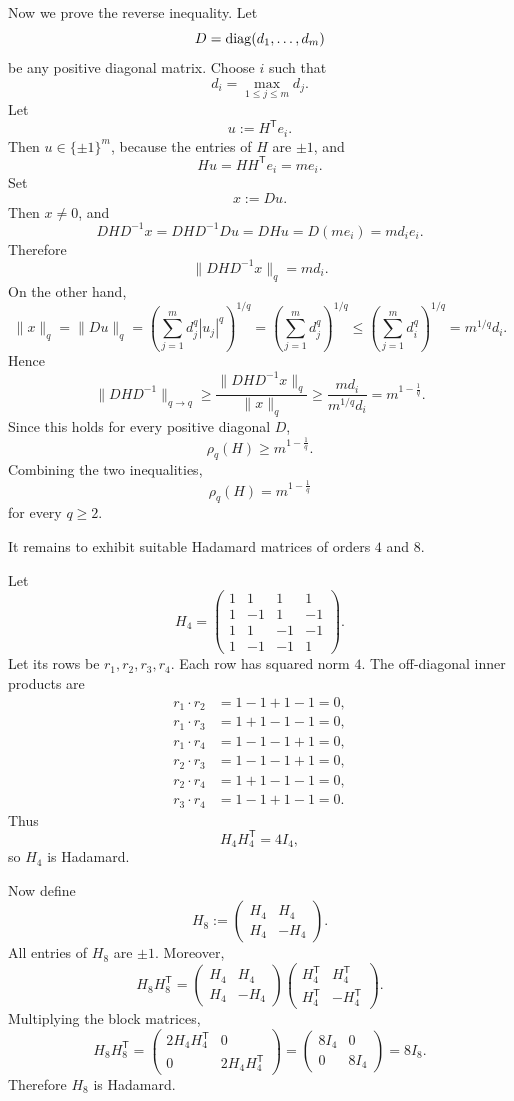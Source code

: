 Now we prove the reverse inequality. Let
\[
D=\operatorname{diag}(d_1,\dots,d_m)
\]
be any positive diagonal matrix. Choose \(i\) such that
\[
d_i=\max_{1\leq j\leq m} d_j.
\]
Let
\[
u:=H^{\mathsf T}e_i.
\]
Then \(u\in \{\pm 1\}^m\), because the entries of \(H\) are \(\pm 1\), and
\[
Hu=HH^{\mathsf T}e_i=m e_i.
\]
Set
\[
x:=Du.
\]
Then \(x\neq 0\), and
\[
DHD^{-1}x
=
DHD^{-1}Du
=
DHu
=
D(me_i)
=
m d_i e_i.
\]
Therefore
\[
\|DHD^{-1}x\|_q=m d_i.
\]
On the other hand,
\[
\|x\|_q
=
\|Du\|_q
=
\left(\sum_{j=1}^m d_j^q |u_j|^q\right)^{1/q}
=
\left(\sum_{j=1}^m d_j^q\right)^{1/q}
\leq
\left(\sum_{j=1}^m d_i^q\right)^{1/q}
=
m^{1/q}d_i.
\]
Hence
\[
\|DHD^{-1}\|_{q\to q}
\geq
\frac{\|DHD^{-1}x\|_q}{\|x\|_q}
\geq
\frac{m d_i}{m^{1/q}d_i}
=
m^{1-\frac1q}.
\]
Since this holds for every positive diagonal \(D\),
\[
\rho_q(H)\geq m^{1-\frac1q}.
\]
Combining the two inequalities,
\[
\boxed{\rho_q(H)=m^{1-\frac1q}}
\]
for every \(q\geq 2\).

It remains to exhibit suitable Hadamard matrices of orders \(4\) and \(8\).

Let
\[
H_4=
\begin{pmatrix}
1&1&1&1\\
1&-1&1&-1\\
1&1&-1&-1\\
1&-1&-1&1
\end{pmatrix}.
\]
Let its rows be \(r_1,r_2,r_3,r_4\). Each row has squared norm \(4\). The off-diagonal inner products are
\[
\begin{aligned}
r_1\cdot r_2&=1-1+1-1=0,\\
r_1\cdot r_3&=1+1-1-1=0,\\
r_1\cdot r_4&=1-1-1+1=0,\\
r_2\cdot r_3&=1-1-1+1=0,\\
r_2\cdot r_4&=1+1-1-1=0,\\
r_3\cdot r_4&=1-1+1-1=0.
\end{aligned}
\]
Thus
\[
H_4H_4^{\mathsf T}=4I_4,
\]
so \(H_4\) is Hadamard.

Now define
\[
H_8:=
\begin{pmatrix}
H_4&H_4\\
H_4&-H_4
\end{pmatrix}.
\]
All entries of \(H_8\) are \(\pm 1\). Moreover,
\[
H_8H_8^{\mathsf T}
=
\begin{pmatrix}
H_4&H_4\\
H_4&-H_4
\end{pmatrix}
\begin{pmatrix}
H_4^{\mathsf T}&H_4^{\mathsf T}\\
H_4^{\mathsf T}&-H_4^{\mathsf T}
\end{pmatrix}.
\]
Multiplying the block matrices,
\[
H_8H_8^{\mathsf T}
=
\begin{pmatrix}
2H_4H_4^{\mathsf T}&0\\
0&2H_4H_4^{\mathsf T}
\end{pmatrix}
=
\begin{pmatrix}
8I_4&0\\
0&8I_4
\end{pmatrix}
=
8I_8.
\]
Therefore \(H_8\) is Hadamard.

